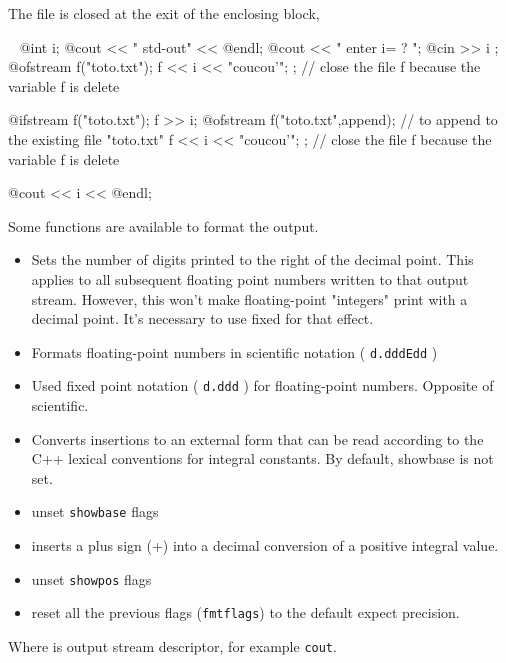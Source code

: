 \documentclass[a4paper,twoside,12pt]{book}
\def\n{\nabla}
\begin{document}
\begin{note} The file is closed
at the exit of the enclosing block,
\end{note}
\begin{example}~
\label{exm:io}
\bFF
@int i;
@cout << " std-out" << @endl;
@cout << " enter i= ? ";
@cin >> i ;
{
  @ofstream f("toto.txt");
  f << i << "coucou'\n";
}; //  close the file f because the variable f is delete

{
  @ifstream f("toto.txt");
   f >> i;
}
{
  @ofstream f("toto.txt",append);
     // to append to the existing file "toto.txt"
  f << i << "coucou'\n";
}; //  close the file f because the variable f is delete

  @cout << i << @endl;
\eFF


  

Some functions are available  to format the output.
\begin{itemize}
\item {} Sets the number of digits printed to the right of the decimal point. This applies to all subsequent floating point numbers written to that output stream. However, this won't make floating-point "integers" print with a decimal point. It's necessary to use fixed for that effect.
\item     {}  Formats floating-point numbers in scientific notation (  \texttt{d.dddEdd} )
\item     {}          Used fixed point notation (  \texttt{d.ddd} ) for floating-point numbers. Opposite of scientific.
\item     {}    Converts insertions to an external form that can be read according to the C++ lexical conventions for integral constants. By default, showbase is not set.
\item     {}   unset \texttt{showbase} flags
\item     {}    inserts a plus sign (+) into a decimal conversion of a positive integral value.
\item     {}  unset \texttt{showpos} flags
 \item   {}     reset all  the previous  flags (\texttt{fmtflags}) to the  default expect precision.
\end{itemize}
Where  is output stream descriptor, for example \texttt{cout}.


\end{example}
\end{document}
